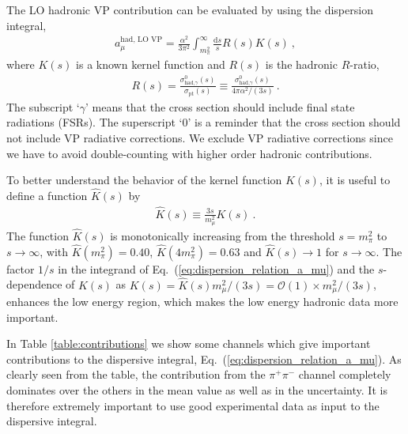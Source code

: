 The LO hadronic VP contribution can be evaluated by using
the dispersion integral,
%
\begin{align}
 a_\mu^{\text{had, LO VP}} =
  \frac{\alpha^2}{3\pi^2} \int_{m_\pi^2}^{\infty}
   \frac{\text{d}s}{s} R(s) K(s)~,
\label{eq:dispersion_relation_a_mu}
\end{align}
%
where $K(s)$ is a known kernel function and
$R(s)$ is the hadronic $R$-ratio,
%
\begin{align}
 R(s) =
  \frac{\sigma^0_{\text{had,} \gamma}(s)}{\sigma_{\text{pt}}(s)}
\equiv
  \frac{\sigma^0_{\text{had,} \gamma}(s)}{4\pi \alpha^2/(3s)}~.
\end{align}
%
The subscript `$\gamma$' means that the cross section
should include final state radiations (FSRs).
The superscript `0' is a reminder that the cross section
should not include VP radiative corrections.  We exclude
VP radiative corrections since we have to avoid
double-counting with higher order hadronic contributions.



To better understand the behavior of the kernel function $K(s)$,
it is useful to define a function $\hat{K}(s)$ by
%
\begin{align}
 \hat{K}(s) \equiv \frac{3s}{m_\mu^2}K(s)~.
\end{align}
%
The function $\hat{K}(s)$ is monotonically increasing
from the threshold $s=m_\pi^2$ to $s \to \infty$, 
with $\hat{K}(m_\pi^2)=0.40$, $\hat{K}(4m_\pi^2)=0.63$
and $\hat{K}(s) \to 1$ for $s \to \infty$.
The factor $1/s$ in the integrand of 
Eq.~(\ref{eq:dispersion_relation_a_mu}) and the
$s$-dependence of $K(s)$ as $K(s)= \hat{K}(s) m_\mu^2/(3s)
= {\mathcal O}(1) \times m_\mu^2/(3s)$,
enhances the low energy region, which makes the 
low energy hadronic data more important.


In Table \ref{table:contributions} we show some channels
which give important contributions to the dispersive
integral, Eq.~(\ref{eq:dispersion_relation_a_mu}). 
As clearly seen from the table, the contribution 
from the $\pi^+\pi^-$ channel completely dominates over
the others in the mean value as well as in the uncertainty.
It is therefore extremely important to use good experimental
data as input to the dispersive integral.


